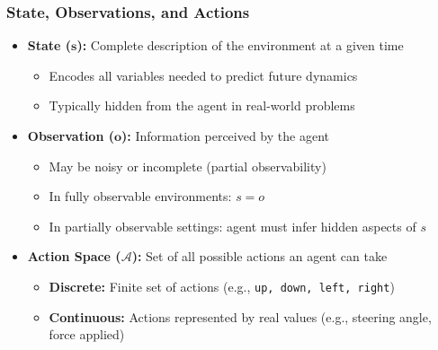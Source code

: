\begin{frame}
    \frametitle{State, Observations, and Actions}
    \begin{itemize}
        \item \textbf{State ($\boldsymbol{s}$):} Complete description of the environment at a given time
        \begin{itemize}\setlength{\itemsep}{4pt}
            \item Encodes all variables needed to predict future dynamics
            \item Typically hidden from the agent in real-world problems
        \end{itemize}
        
        \item \textbf{Observation ($\boldsymbol{o}$):} Information perceived by the agent
        \begin{itemize}\setlength{\itemsep}{4pt}
            \item May be noisy or incomplete (partial observability)
            \item In fully observable environments: $s = o$
            \item In partially observable settings: agent must infer hidden aspects of $s$
        \end{itemize}
        
        \item \textbf{Action Space ($\mathcal{A}$):} Set of all possible actions an agent can take
        \begin{itemize}\setlength{\itemsep}{4pt}
            \item \textbf{Discrete:} Finite set of actions (e.g., \texttt{up, down, left, right})
            \item \textbf{Continuous:} Actions represented by real values (e.g., steering angle, force applied)
        \end{itemize}
    \end{itemize}
\end{frame}



